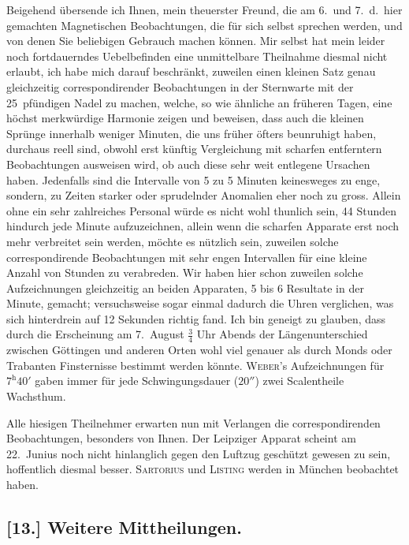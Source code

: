 \documentclass[12pt,a4paper]{article}
\begin{document}
Beigehend \"ubersende ich Ihnen, mein theuerster Freund, die am 6.~und 7.~d.~hier gemachten Magnetischen Beobachtungen, die f\"ur sich selbst sprechen werden, und von denen Sie beliebigen Gebrauch machen k\"onnen. Mir selbst hat mein leider noch fortdauerndes Uebelbefinden eine unmittelbare Theilnahme diesmal nicht erlaubt, ich habe mich darauf beschr\"ankt, zuweilen einen kleinen Satz genau gleichzeitig correspondirender Beobachtungen in der Sternwarte mit der 25~pf\"undigen Nadel zu machen, welche, so wie \"ahnliche an fr\"uheren Tagen, eine h\"ochst merkw\"urdige Harmonie zeigen und beweisen, dass auch die kleinen Spr\"unge innerhalb weniger Minuten, die uns fr\"uher \"ofters beunruhigt haben, durchaus reell sind, obwohl erst k\"unftig Vergleichung mit scharfen entferntern Beobachtungen ausweisen wird, ob auch diese sehr weit entlegene Ursachen haben. Jedenfalls sind die Intervalle von 5 zu 5 Minuten keinesweges zu enge, sondern, zu Zeiten starker oder sprudelnder Anomalien eher noch zu gross. Allein ohne ein sehr zahlreiches Personal w\"urde es nicht wohl thunlich sein, 44 Stunden hindurch jede Minute aufzuzeichnen, allein wenn die scharfen Apparate erst noch mehr verbreitet sein werden, m\"ochte es n\"utzlich sein, zuweilen solche correspondirende Beobachtungen mit sehr engen Intervallen f\"ur eine kleine Anzahl von Stunden zu verabreden. Wir haben hier schon zuweilen solche Aufzeichnungen gleichzeitig an beiden Apparaten, 5 bis 6 Resultate in der Minute, gemacht; versuchsweise sogar einmal dadurch die Uhren verglichen, was sich hinterdrein auf 12 Sekunden richtig fand. Ich bin geneigt zu glauben, dass durch die Erscheinung am 7.~August $\frac34$ Uhr Abends der L\"angenunterschied zwischen G\"ottingen und anderen Orten wohl viel genauer als durch Monds oder Trabanten Finsternisse bestimmt werden k\"onnte. \textsc{Weber}'s Aufzeichnungen f\"ur $7^{\mathrm{h}} 40'$ gaben immer f\"ur jede Schwingungsdauer ($20''$) zwei Scalentheile Wachsthum.

Alle hiesigen Theilnehmer erwarten nun mit Verlangen die correspondirenden Beobachtungen, besonders von Ihnen. Der Leipziger Apparat scheint am 22.~Junius noch nicht hinlanglich gegen den Luftzug gesch\"utzt gewesen zu sein, hoffentlich diesmal besser. \textsc{Sartorius} und \textsc{Listing} werden in M\"unchen beobachtet haben.\dotfill

\subsection*{[13.] Weitere Mittheilungen.}
\end{document}
